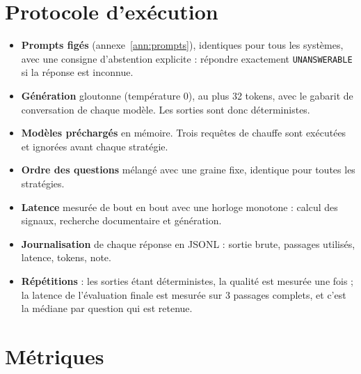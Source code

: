 \documentclass[11pt,a4paper]{article}
\begin{document}
\section{Protocole d'exécution}\label{sec:execution}

\begin{itemize}
\item \textbf{Prompts figés} (annexe~\ref{ann:prompts}), identiques pour tous les systèmes, avec une
consigne d'abstention explicite : répondre exactement \texttt{UNANSWERABLE} si la réponse est inconnue.
\item \textbf{Génération} gloutonne (température 0), au plus 32 tokens, avec le gabarit de conversation
de chaque modèle. Les sorties sont donc déterministes.
\item \textbf{Modèles préchargés} en mémoire. Trois requêtes de chauffe sont exécutées et ignorées avant
chaque stratégie.
\item \textbf{Ordre des questions} mélangé avec une graine fixe, identique pour toutes les stratégies.
\item \textbf{Latence} mesurée de bout en bout avec une horloge monotone : calcul des signaux, recherche
documentaire et génération.
\item \textbf{Journalisation} de chaque réponse en JSONL : sortie brute, passages utilisés, latence,
tokens, note.
\item \textbf{Répétitions} : les sorties étant déterministes, la qualité est mesurée une fois ; la
latence de l'évaluation finale est mesurée sur 3 passages complets, et c'est la médiane par question
qui est retenue.
\end{itemize}

\section{Métriques}\label{sec:metriques}
\end{document}
